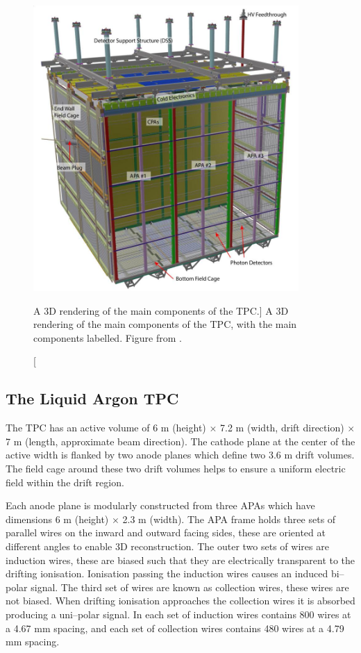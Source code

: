 \begin{figure}

	\centering

	\includegraphics[width=0.9\textwidth]{figures/pdsp_tpc.jpg}

	\caption
	[A 3D rendering of the main components of the \protodune{} TPC.]
	{A 3D rendering of the main components of the \protodune{} TPC, with the main
	components labelled. Figure from \cite{Abi:2017aow}.}

	\label{fig:pdsp_tpc}

\end{figure}

\subsection{The Liquid Argon TPC}

The \protodune{} TPC has an active volume of 6 m (height) $\times$ 7.2 m (width,
drift direction) $\times$ 7 m (length, approximate beam direction). The cathode 
plane at the center of the active width is flanked by two anode planes which 
define two 3.6 m drift volumes. The field cage around these two drift volumes
helps to ensure a uniform electric field within the drift region.

Each anode plane is modularly constructed from three APAs which have dimensions
6 m (height) $\times$ 2.3 m (width). The APA frame holds three sets of parallel
wires on the inward and outward facing sides, these are oriented at different 
angles to enable 3D reconstruction. The outer two sets of wires are induction
wires, these are biased such that they are electrically transparent to the 
drifting ionisation. Ionisation passing the induction wires causes an induced 
bi--polar signal. The third set of wires are known as collection wires, these
wires are not biased. When drifting ionisation approaches the collection wires 
it is absorbed producing a uni--polar signal. In \protodune{} each set of 
induction wires contains 800 wires at a 4.67 mm spacing, and each set of 
collection wires contains 480 wires at a 4.79 mm spacing. 

